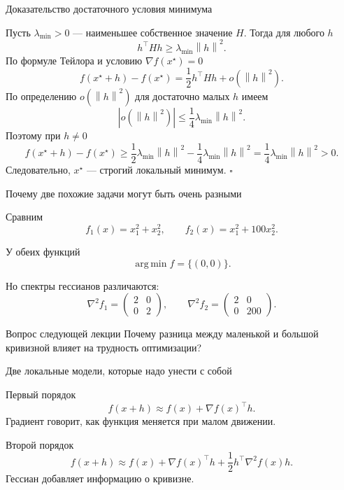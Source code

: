 \documentclass[aspectratio=169,10pt]{beamer}
\newcommand{\norm}[1]{\left\lVert #1\right\rVert}
\newcommand{\grad}{\nabla}
\newcommand{\Hess}{\nabla^2}
\newcommand{\argmin}{\operatorname*{arg\,min}}
\begin{document}
\begin{frame}{Доказательство достаточного условия минимума}
\small
\vspace{0.08em}

Пусть $\lambda_{\min}>0$ --- наименьшее собственное значение $H$. Тогда для любого $h$
\[
  h^\top Hh\ge \lambda_{\min}\norm{h}^2.
\]
По формуле Тейлора и условию $\grad f(x^\star)=0$
\[
 f(x^\star+h)-f(x^\star)
 =\frac12h^\top Hh+o(\norm{h}^2).
\]
По определению $o(\norm{h}^2)$ для достаточно малых $h$ имеем
\[
  \left|o(\norm{h}^2)\right|
  \le \frac14\lambda_{\min}\norm{h}^2.
\]
Поэтому при $h\neq0$
\[
 f(x^\star+h)-f(x^\star)
 \ge \frac12\lambda_{\min}\norm{h}^2
      -\frac14\lambda_{\min}\norm{h}^2
 =\frac14\lambda_{\min}\norm{h}^2>0.
\]
Следовательно, $x^\star$ --- строгий локальный минимум. $\square$
\end{frame}

\begin{frame}{Почему две похожие задачи могут быть очень разными}
\vspace{0.35em}

Сравним
\[
 f_1(x)=x_1^2+x_2^2,
 \qquad
 f_2(x)=x_1^2+100x_2^2.
\]

У обеих функций
\[
 \argmin f=\{(0,0)\}.
\]

Но спектры гессианов различаются:
\[
 \Hess f_1=\begin{pmatrix}2&0\\0&2\end{pmatrix},
 \qquad
 \Hess f_2=\begin{pmatrix}2&0\\0&200\end{pmatrix}.
\]

\begin{alertblock}{Вопрос следующей лекции}
Почему разница между маленькой и большой кривизной влияет на трудность оптимизации?
\end{alertblock}

\end{frame}

\begin{frame}{Две локальные модели, которые надо унести с собой}
\vspace{0.45em}

\begin{block}{Первый порядок}
\[
  \boxed{f(x+h)\approx f(x)+\grad f(x)^\top h.}
\]
Градиент говорит, как функция меняется при малом движении.
\end{block}

\vspace{0.35em}

\begin{block}{Второй порядок}
\[
  \boxed{
  f(x+h)\approx
  f(x)+\grad f(x)^\top h+\frac12h^\top\Hess f(x)h.
  }
\]
Гессиан добавляет информацию о кривизне.
\end{block}

\end{frame}
\end{document}
